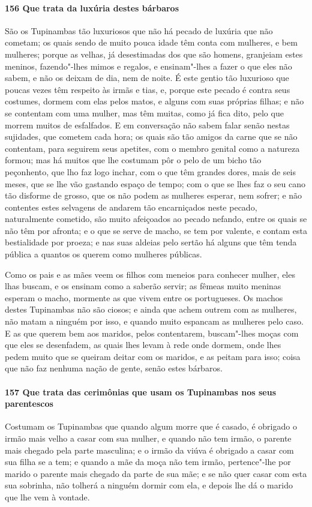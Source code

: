 \begin{linenumbers}
\paragraph{156 Que trata da luxúria destes bárbaros}\quad
São os Tupinambas tão luxuriosos que não há pecado de luxúria que não cometam; os quais
sendo de muito pouca idade têm conta com mulheres, e bem mulheres; porque as velhas, já
desestimadas dos que são homens, granjeiam estes meninos, fazendo"-lhes mimos e regalos, e
ensinam"-lhes a fazer o que eles não sabem, e não os deixam de dia, nem de noite. É este
gentio tão luxurioso que poucas vezes têm respeito às irmãs e tias, e, porque este pecado
é contra seus costumes, dormem com elas pelos matos, e alguns com suas próprias filhas; e
não se contentam com uma mulher, mas têm muitas, como já fica dito, pelo que morrem muitos
de esfalfados. E em conversação não sabem falar senão nestas sujidades, que cometem cada
hora; os quais são tão amigos da carne que se não contentam, para seguirem seus apetites,
com o membro genital como a natureza formou; mas há muitos que lhe costumam pôr o pelo de
um bicho tão peçonhento, que lho faz logo inchar, com o que têm grandes dores, mais de
seis meses, que se lhe vão gastando espaço de tempo; com o que se lhes faz o seu cano tão
disforme de grosso, que os não podem as mulheres esperar, nem sofrer; e não contentes
estes selvagens de andarem tão encarniçados neste pecado, naturalmente cometido, são muito
afeiçoados ao pecado nefando, entre os quais se não têm por afronta; e o que se serve de
macho, se tem por valente, e contam esta bestialidade por proeza; e nas suas aldeias pelo
sertão há alguns que têm tenda pública a quantos os querem como mulheres públicas.

Como os pais e as mães veem os filhos com meneios para conhecer mulher, eles lhas buscam,
e os ensinam como a saberão servir; as fêmeas muito meninas esperam o macho, mormente as
que vivem entre os portugueses. Os machos destes Tupinambas não são ciosos; e ainda que
achem outrem com as mulheres, não matam a ninguém por isso, e quando muito espancam as
mulheres pelo caso. E as que querem bem aos maridos, pelos contentarem, buscam"-lhes moças
com que eles se desenfadem, as quais lhes levam à rede onde dormem, onde lhes pedem muito
que se queiram deitar com os maridos, e as peitam para isso; coisa que não faz nenhuma
nação de gente, senão estes bárbaros.

\paragraph{157 Que trata das cerimônias que usam os Tupinambas nos seus parentescos}\quad
Costumam os Tupinambas que quando algum morre que é casado, é obrigado o irmão mais velho
a casar com sua mulher, e quando não tem irmão, o parente mais chegado pela parte
masculina; e o irmão da viúva é obrigado a casar com sua filha se a tem; e quando a mãe da
moça não tem irmão, pertence"-lhe por marido o parente mais chegado da parte de sua mãe; e
se não quer casar com esta sua sobrinha, não tolherá a ninguém dormir com ela, e depois
lhe dá o marido que lhe vem à vontade.


\end{linenumbers}

